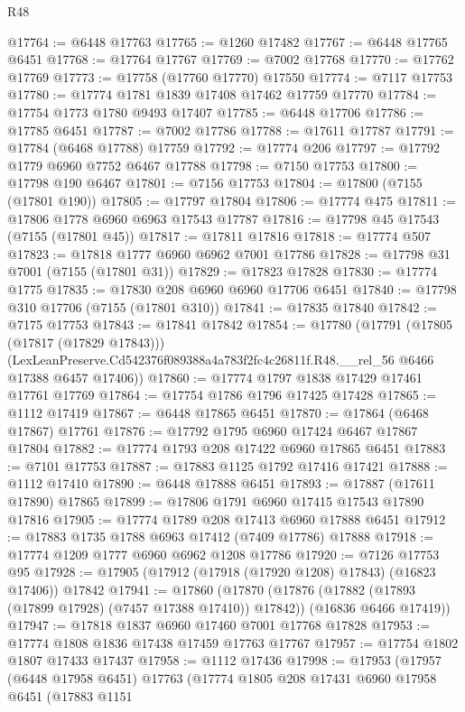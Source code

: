 \begin{lexlean}{R48}
\begin{coremodule}
@17764 := @6448 @17763
@17765 := @1260 @17482
@17767 := @6448 @17765 @6451
@17768 := @17764 @17767
@17769 := @7002 @17768
@17770 := @17762 @17769
@17773 := @17758 (@17760 @17770) @17550
@17774 := @7117 @17753
@17780 := @17774 @1781 @1839 @17408 @17462 @17759 @17770
@17784 := @17754 @1773 @1780 @9493 @17407
@17785 := @6448 @17706
@17786 := @17785 @6451
@17787 := @7002 @17786
@17788 := @17611 @17787
@17791 := @17784 (@6468 @17788) @17759
@17792 := @17774 @206
@17797 := @17792 @1779 @6960 @7752 @6467 @17788
@17798 := @7150 @17753
@17800 := @17798 @190 @6467
@17801 := @7156 @17753
@17804 := @17800 (@7155 (@17801 @190))
@17805 := @17797 @17804
@17806 := @17774 @475
@17811 := @17806 @1778 @6960 @6963 @17543 @17787
@17816 := @17798 @45 @17543 (@7155 (@17801 @45))
@17817 := @17811 @17816
@17818 := @17774 @507
@17823 := @17818 @1777 @6960 @6962 @7001 @17786
@17828 := @17798 @31 @7001 (@7155 (@17801 @31))
@17829 := @17823 @17828
@17830 := @17774 @1775
@17835 := @17830 @208 @6960 @6960 @17706 @6451
@17840 := @17798 @310 @17706 (@7155 (@17801 @310))
@17841 := @17835 @17840
@17842 := @7175 @17753
@17843 := @17841 @17842
@17854 := @17780
    (@17791
      (@17805 (@17817 (@17829 @17843)))
      (LexLeanPreserve.Cd542376f089388a4a783f2fc4c26811f.R48.__rel_56 @6466 @17388 @6457 @17406))
@17860 := @17774 @1797 @1838 @17429 @17461 @17761 @17769
@17864 := @17754 @1786 @1796 @17425 @17428
@17865 := @1112 @17419
@17867 := @6448 @17865 @6451
@17870 := @17864 (@6468 @17867) @17761
@17876 := @17792 @1795 @6960 @17424 @6467 @17867 @17804
@17882 := @17774 @1793 @208 @17422 @6960 @17865 @6451
@17883 := @7101 @17753
@17887 := @17883 @1125 @1792 @17416 @17421
@17888 := @1112 @17410
@17890 := @6448 @17888 @6451
@17893 := @17887 (@17611 @17890) @17865
@17899 := @17806 @1791 @6960 @17415 @17543 @17890 @17816
@17905 := @17774 @1789 @208 @17413 @6960 @17888 @6451
@17912 := @17883 @1735 @1788 @6963 @17412 (@7409 @17786) @17888
@17918 := @17774 @1209 @1777 @6960 @6962 @1208 @17786
@17920 := @7126 @17753 @95
@17928 := @17905 (@17912 (@17918 (@17920 @1208) @17843) (@16823 @17406)) @17842
@17941 := @17860
    (@17870
      (@17876 (@17882 (@17893 (@17899 @17928) (@7457 @17388 @17410)) @17842))
      (@16836 @6466 @17419))
@17947 := @17818 @1837 @6960 @17460 @7001 @17768 @17828
@17953 := @17774 @1808 @1836 @17438 @17459 @17763 @17767
@17957 := @17754 @1802 @1807 @17433 @17437
@17958 := @1112 @17436
@17998 := @17953
    (@17957
      (@6448 @17958 @6451)
      @17763
      (@17774
        @1805
        @208
        @17431
        @6960
        @17958
        @6451
        (@17883
          @1151

\end{coremodule}
\end{lexlean}
